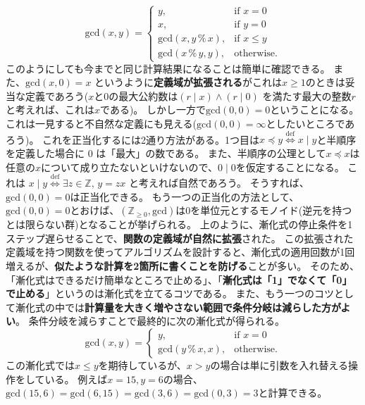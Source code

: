 \documentclass[a4paper,oneside,onecolumn,openany,article,10pt]{memoir}
\theoremstyle{remark}
\begin{document}
\begin{equation}
\mathrm{gcd}(x, y) =
\begin{cases}
y,& \text{if } x = 0\\
x,& \text{if } y = 0\\
\mathrm{gcd}(x, y\, \%\, x),& \text{if } x\le y\\
\mathrm{gcd}(x\, \%\, y, y),& \text{otherwise.}
\end{cases}
\end{equation}
このようにしても今までと同じ計算結果になることは簡単に確認できる。
また、$\mathrm{gcd}(x, 0)=x$ というように\textbf{定義域が拡張される}がこれは$x\ge 1$のときは妥当な定義であろう($x$と0の最大公約数は$(r \mid x)\land (r\mid 0)$
を満たす最大の整数$r$と考えれば、これは$x$である)。
しかし一方で$\mathrm{gcd}(0, 0)=0$ということになる。これは一見すると不自然な定義にも見える($\mathrm{gcd}(0,0)=\infty$としたいところであろう)。
これを正当化するには2通り方法がある。1つ目は$x\preceq y \stackrel{\mathrm{def}}{\iff} x\mid y$と半順序を定義した場合に 0 は「最大」の数である。
また、半順序の公理として$x\preceq x$は任意の$x$について成り立たないといけないので、$0\mid 0$を仮定することになる。
これは $x \mid y\stackrel{\mathrm{def}}{\iff} \exists z\in \mathbb{Z},\, y = zx$ と考えれば自然であろう。
そうすれば、$\mathrm{gcd}(0,0)=0$は正当化できる。
もう一つの正当化の方法として、$\mathrm{gcd}(0,0)=0$とおけば、$(\mathbb{Z}_{\ge 0}, \mathrm{gcd})$は0を単位元とするモノイド(逆元を持つとは限らない群)となることが挙げられる。
上のように、漸化式の停止条件を1ステップ遅らせることで、\textbf{関数の定義域が自然に拡張}された。
この拡張された定義域を持つ関数を使ってアルゴリズムを設計すると、漸化式の適用回数が1回増えるが、\textbf{似たような計算を2箇所に書くことを防げる}ことが多い。
そのため、「漸化式はできるだけ簡単なところで止める」、「\textbf{漸化式は「1」でなくて「0」で止める}」というのは漸化式を立てるコツである。
また、もう一つのコツとして漸化式の中では\textbf{計算量を大きく増やさない範囲で条件分岐は減らした方がよい}。
条件分岐を減らすことで最終的に次の漸化式が得られる。
\begin{equation}
\mathrm{gcd}(x, y) =
\begin{cases}
y,& \text{if } x = 0\\
\mathrm{gcd}(y\, \%\, x, x),& \text{otherwise.}
\end{cases}
\label{eq:gcd4}
\end{equation}
この漸化式では$x\le y$を期待しているが、$x>y$の場合は単に引数を入れ替える操作をしている。
例えば$x=15, y=6$の場合、$\mathrm{gcd}(15, 6) = \mathrm{gcd}(6, 15) = \mathrm{gcd}(3, 6) = \mathrm{gcd}(0, 3) = 3$と計算できる。
\end{document}
